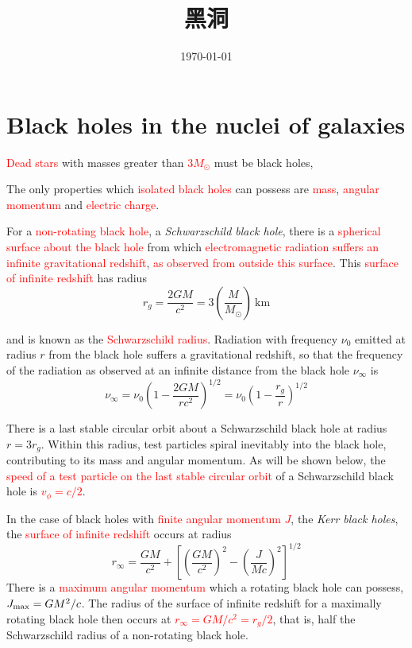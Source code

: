 \documentclass[12pt,a4paper]{article}
\title{黑洞}
\author{}
\date{\today}
\begin{document}
\maketitle

\section{Black holes in the nuclei of galaxies}
\textcolor{red}{Dead stars} with masses greater than \textcolor{red}{$3M_{\odot}$} must be black holes,

The only properties which \textcolor{red}{isolated black holes} can possess are \textcolor{red}{mass}, \textcolor{red}{angular momentum} and \textcolor{red}{electric charge}.

For a \textcolor{red}{non-rotating black hole}, a \emph{Schwarzschild black hole}, there is a \textcolor{red}{spherical surface about the black hole} from which \textcolor{red}{electromagnetic radiation suffers an infinite gravitational redshift}, \textcolor{red}{as observed from outside this surface}. This \textcolor{red}{surface of infinite redshift} has radius
\begin{equation}
r_g = \frac{2GM}{c^2} = 3\left(\frac{M}{M_{\odot}}\right) ~\text{km}
\end{equation}

and is known as the \textcolor{red}{Schwarzschild radius}. Radiation with frequency $\nu_0$ emitted at
radius $r$ from the black hole suffers a gravitational redshift, so that the frequency of the radiation as observed at an infinite distance from the black hole $\nu_{\infty}$ is
\begin{equation}
\nu_{\infty} = \nu_0 \left(1- \frac{2GM}{rc^2} \right)^{1/2} = \nu_0 \left(1- \frac{r_g}{r} \right)^{1/2}
\end{equation}

There is a last stable circular orbit about a Schwarzschild black hole at radius $r = 3 r_g$. Within this radius, test particles spiral inevitably into the black hole, contributing to its mass and angular momentum. As will be shown below, the \textcolor{red}{speed of a test particle on the last stable circular orbit} of a Schwarzschild black hole is \textcolor{red}{$v_{\phi} = c/2$}.

In the case of black holes with \textcolor{red}{finite angular momentum $J$}, the \emph{Kerr black holes}, the \textcolor{red}{surface of infinite redshift} occurs at radius
\begin{equation}
r_{\infty} = \frac{GM}{c^2} + \left[ \left(\frac{GM}{c^2} \right)^2 -\left(\frac{J}{Mc} \right)^2 \right]^{1/2}
\end{equation}
There is a \textcolor{red}{maximum angular momentum} which a rotating black hole can possess, \textcolor{red}{$J_{\rm max} = GM^2/c$}. The radius of the surface of infinite redshift for a maximally rotating black hole then occurs at \textcolor{red}{$r_{\infty} = GM/c^2 = r_g/2$}, that is, half the Schwarzschild radius of a non-rotating black hole.
\end{document}
